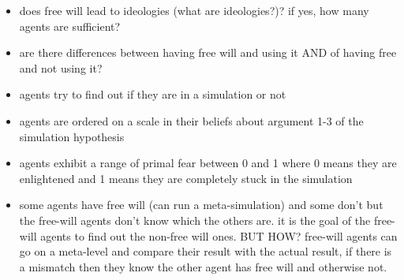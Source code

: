 \begin{itemize}
	\item does free will lead to ideologies (what are ideologies?)? if yes, how many agents are sufficient?
	\item are there differences between having free will and using it AND of having free and not using it?
	\item agents try to find out if they are in a simulation or not
	\item agents are ordered on a scale in their beliefs about argument 1-3 of the simulation hypothesis 
	\item agents exhibit a range of primal fear between 0 and 1 where 0 means they are enlightened and 1 means they are completely stuck in the simulation
	\item some agents have free will (can run a meta-simulation) and some don't but the free-will agents don't know which the others are. it is the goal of the free-will agents to find out the non-free will ones. BUT HOW? free-will agents can go on a meta-level and compare their result with the actual result, if there is a mismatch then they know the other agent has free will and otherwise not.
\end{itemize}